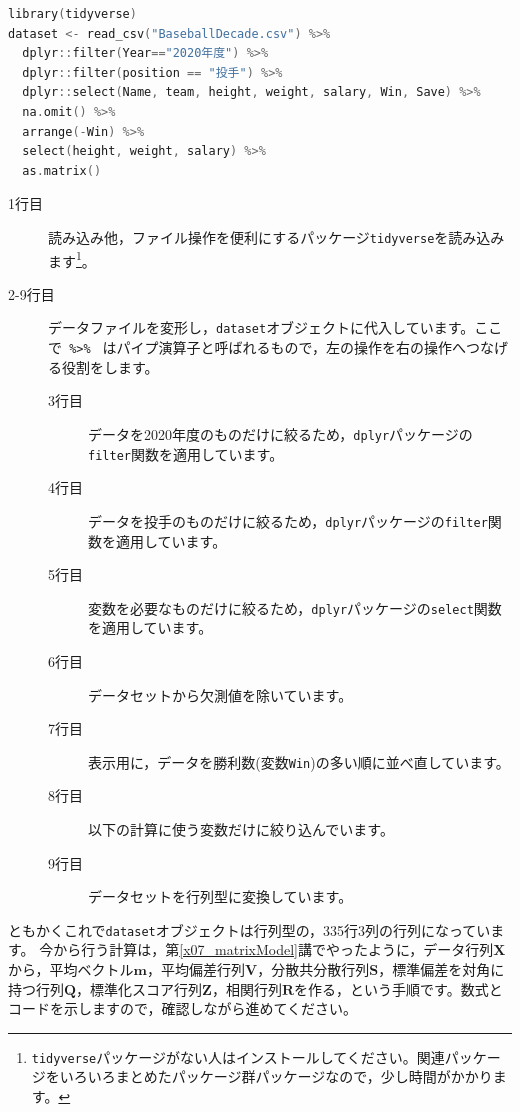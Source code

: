 \documentclass{ltjsbook}
\begin{document}
\begin{lstlisting}[language=c++,label={code:09_07},caption={データファイルの読み込み}]
library(tidyverse)
dataset <- read_csv("BaseballDecade.csv") %>%
  dplyr::filter(Year=="2020年度") %>% 
  dplyr::filter(position == "投手") %>%
  dplyr::select(Name, team, height, weight, salary, Win, Save) %>%
  na.omit() %>%
  arrange(-Win) %>% 
  select(height, weight, salary) %>%
  as.matrix() 
\end{lstlisting}
\begin{description}
	\item[1行目] 読み込み他，ファイル操作を便利にするパッケージ\texttt{tidyverse}を読み込みます\footnote{\texttt{tidyverse}パッケージがない人はインストールしてください。関連パッケージをいろいろまとめたパッケージ群パッケージなので，少し時間がかかります。}。
	\item[2-9行目] データファイルを変形し，\texttt{dataset}オブジェクトに代入しています。ここで\verb| %>% | はパイプ演算子と呼ばれるもので，左の操作を右の操作へつなげる役割をします。
	      \begin{description}
		      \item[3行目] データを2020年度のものだけに絞るため，\verb|dplyr|パッケージの\verb|filter|関数を適用しています。
		      \item[4行目] データを投手のものだけに絞るため，\verb|dplyr|パッケージの\verb|filter|関数を適用しています。
		      \item[5行目] 変数を必要なものだけに絞るため，\verb|dplyr|パッケージの\verb|select|関数を適用しています。
		      \item[6行目] データセットから欠測値を除いています。
		      \item[7行目] 表示用に，データを勝利数(変数\verb|Win|)の多い順に並べ直しています。
		      \item[8行目] 以下の計算に使う変数だけに絞り込んでいます。
		      \item[9行目] データセットを行列型に変換しています。
	      \end{description}
\end{description}

ともかくこれで\texttt{dataset}オブジェクトは行列型の，335行3列の行列になっています。
今から行う計算は，第\ref{x07_matrixModel}講でやったように，データ行列$\bm{X}$から，平均ベクトル$\bm{m}$，平均偏差行列$\bm{V}$，分散共分散行列$\bm{S}$，標準偏差を対角に持つ行列$\bm{Q}$，標準化スコア行列$\bm{Z}$，相関行列$\bm{R}$を作る，という手順です。数式とコードを示しますので，確認しながら進めてください。
\end{document}
